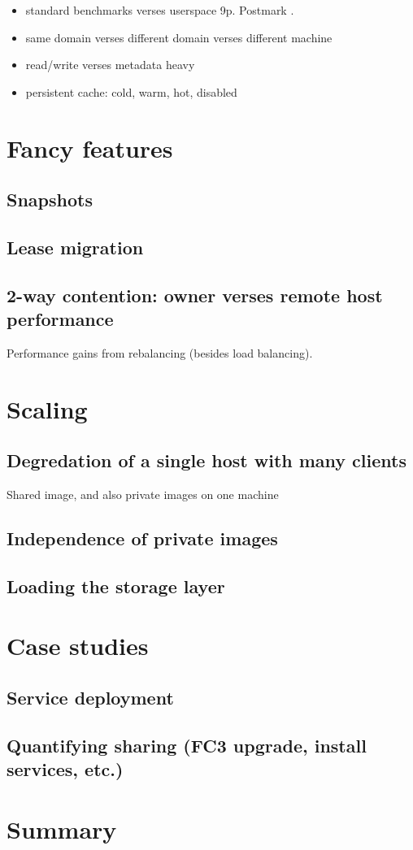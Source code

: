 \begin{itemize}
\item standard benchmarks verses userspace 9p. Postmark \cite{katcher}.
\item same domain verses different domain verses different machine
\item read/write verses metadata heavy
\item persistent cache: cold, warm, hot, disabled
\end{itemize}

\section{Fancy features}
\subsection{Snapshots}
\subsection{Lease migration}
\subsection{2-way contention: owner verses remote host performance}
Performance gains from rebalancing (besides load balancing).

\section{Scaling}
\subsection{Degredation of a single host with many clients}
Shared image, and also private images on one machine
\subsection{Independence of private images}
\subsection{Loading the storage layer}

\section{Case studies}
\subsection{Service deployment}
\subsection{Quantifying sharing (FC3 upgrade, install services, etc.)}

\section{Summary}